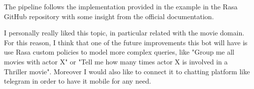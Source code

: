 \documentclass[11pt,a4paper]{article}
\begin{document}
The pipeline follows the implementation provided in the example in the Rasa GitHub repository with some insight from the official documentation.

I personally really liked this topic, in particular related with the movie domain. For this reason, I think that one of the future improvements this bot will have is use Rasa custom policies to model more complex queries, like "Group me all movies with actor X" or "Tell me how many times actor X is involved in a Thriller movie". Moreover I would also like to connect it to chatting platform like telegram in order to have it mobile for any need.
\end{document}
